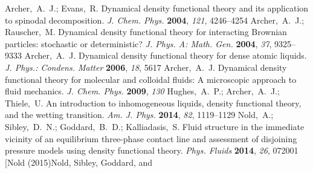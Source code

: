 \documentclass[journal=langd5,manuscript=article]{achemso}
\begin{document}
\begin{mcitethebibliography}{71}
\mciteBstWouldAddEndPuncttrue
\mciteSetBstMidEndSepPunct{\mcitedefaultmidpunct}
{\mcitedefaultendpunct}{\mcitedefaultseppunct}\relax
\EndOfBibitem
{}
Archer,~A.~J.; Evans,~R. Dynamical density functional theory and its
  application to spinodal decomposition. \emph{J. Chem. Phys.} \textbf{2004},
  \emph{121}, 4246--4254\relax
\mciteBstWouldAddEndPuncttrue
\mciteSetBstMidEndSepPunct{\mcitedefaultmidpunct}
{\mcitedefaultendpunct}{\mcitedefaultseppunct}\relax
\EndOfBibitem
{}
Archer,~A.~J.; Rauscher,~M. Dynamical density functional theory for interacting
  Brownian particles: stochastic or deterministic? \emph{J. Phys. A: Math.
  Gen.} \textbf{2004}, \emph{37}, 9325--9333\relax
\mciteBstWouldAddEndPuncttrue
\mciteSetBstMidEndSepPunct{\mcitedefaultmidpunct}
{\mcitedefaultendpunct}{\mcitedefaultseppunct}\relax
\EndOfBibitem
{}
Archer,~A.~J. Dynamical density functional theory for dense atomic liquids.
  \emph{J. Phys.: Condens. Matter} \textbf{2006}, \emph{18}, 5617\relax
\mciteBstWouldAddEndPuncttrue
\mciteSetBstMidEndSepPunct{\mcitedefaultmidpunct}
{\mcitedefaultendpunct}{\mcitedefaultseppunct}\relax
\EndOfBibitem
{}
Archer,~A.~J. Dynamical density functional theory for molecular and colloidal
  fluids: A microscopic approach to fluid mechanics. \emph{J. Chem. Phys.}
  \textbf{2009}, \emph{130}\relax
\mciteBstWouldAddEndPuncttrue
\mciteSetBstMidEndSepPunct{\mcitedefaultmidpunct}
{\mcitedefaultendpunct}{\mcitedefaultseppunct}\relax
\EndOfBibitem
{}
Hughes,~A.~P.; Archer,~A.~J.; Thiele,~U. An introduction to inhomogeneous
  liquids, density functional theory, and the wetting transition. \emph{Am. J.
  Phys.} \textbf{2014}, \emph{82}, 1119--1129\relax
\mciteBstWouldAddEndPuncttrue
\mciteSetBstMidEndSepPunct{\mcitedefaultmidpunct}
{\mcitedefaultendpunct}{\mcitedefaultseppunct}\relax
\EndOfBibitem
{}
Nold,~A.; Sibley,~D.~N.; Goddard,~B.~D.; Kalliadasis,~S. Fluid structure in the
  immediate vicinity of an equilibrium three-phase contact line and assessment
  of disjoining pressure models using density functional theory. \emph{Phys.
  Fluids} \textbf{2014}, \emph{26}, 072001\relax
\mciteBstWouldAddEndPuncttrue
\mciteSetBstMidEndSepPunct{\mcitedefaultmidpunct}
{\mcitedefaultendpunct}{\mcitedefaultseppunct}\relax
\EndOfBibitem
\bibitem[Nold (2015)Nold, Sibley, Goddard, and

\end{mcitethebibliography}
\end{document}
